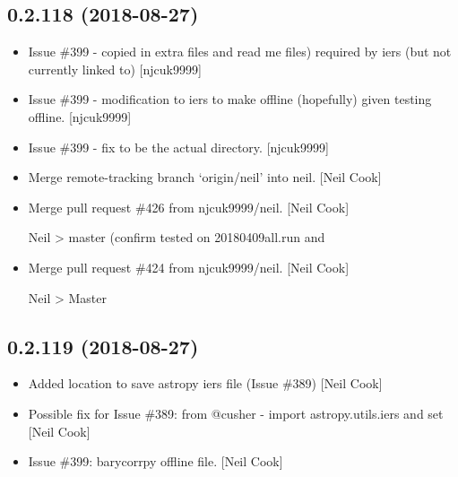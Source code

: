\documentclass[a4paper,10pt,english]{report}
\begin{document}
\subsection{0.2.118 (2018-08-27)}
\label{\detokenize{misc/changelog:id349}}\begin{itemize}
\item {} 
Issue \#399 - copied in extra files  and read me files) required
by iers (but not currently linked to) {[}njcuk9999{]}

\item {} 
Issue \#399 - modification to iers to make offline (hopefully) given
testing offline. {[}njcuk9999{]}

\item {} 
Issue \#399 - fix  to be the actual directory.
{[}njcuk9999{]}

\item {} 
Merge remote-tracking branch ‘origin/neil’ into neil. {[}Neil Cook{]}

\item {} 
Merge pull request \#426 from njcuk9999/neil. {[}Neil Cook{]}

Neil \textendash{}\textgreater{} master (confirm tested on 20180409all.run and 

\item {} 
Merge pull request \#424 from njcuk9999/neil. {[}Neil Cook{]}

Neil \textendash{}\textgreater{} Master

\end{itemize}


\subsection{0.2.119 (2018-08-27)}
\label{\detokenize{misc/changelog:id350}}\begin{itemize}
\item {} 
Added location to save astropy iers file (Issue \#389) {[}Neil Cook{]}

\item {} 
Possible fix for Issue \#389: from @cusher - import
astropy.utils.iers and set  {[}Neil Cook{]}

\item {} 
Issue \#399: barycorrpy offline file. {[}Neil Cook{]}

\end{itemize}
\end{document}
